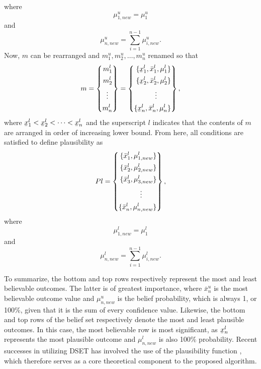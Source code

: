 \documentclass[12pt]{uthesis-v12}  %
\newcommand{\ubar}[1]{\underaccent{\bar}{#1}}
\begin{document}
\noindent where 
\begin{equation}
\mu_{1,new}^u = \mu_1^u
\label{mu1l}
\end{equation}
and
\begin{equation}
\mu_{n,new}^u = \sum_{i=1}^{n-1} \mu_{i,new}^u.
\label{mul}
\end{equation}
Now, $m$ can be rearranged and $m_{1}^{u}, m_{2}^{u},\dots, m_{n}^{u}$ renamed so that \cite{elkin}
\begin{equation}
m = \left\{
\begin{aligned}
m_1^l \\
m_2^l \\
\vdotswithin{m_n^l} \\
m_n^l
\end{aligned}
\right\}
= \left\{ 
\begin{aligned}
\{\ubar{x}_1^l, \bar{x}_1^l, \mu_1^l \} \\
\{\ubar{x}_2^l, \bar{x}_2^l, \mu_2^l \} \\
\vdotswithin{\ubar{x}_n^l, \bar{x}_n^l, \mu_n^l} \\
\{\ubar{x}_n^l, \bar{x}_n^l, \mu_n^l \}
\end{aligned}
\right\},
\label{ml}
\end{equation}
where $\ubar{x}_{1}^{l} < \ubar{x}_{2}^{l} < \dots < \ubar{x}_{n}^{l}$ and the superscript $l$ indicates that the contents of $m$ are arranged in order of increasing lower bound. From here, all conditions are satisfied to define plausibility as \cite{elkin}
\begin{equation}
Pl = \left\{
\begin{aligned}
\{\bar{x}_1^l, \mu_{1,new}^l \} \\
\{\bar{x}_2^l, \mu_{2,new}^l \} \\
\{\bar{x}_3^l, \mu_{3,new}^l \} \\
\vdotswithin{\bar{x}_n^l, \mu_{n,new}^l} \\
\{\bar{x}_n^l, \mu_{n,new}^l \}
\end{aligned}
\right\},
\label{m2}
\end{equation}
\noindent where
\begin{equation}
\mu_{1,new}^l = \mu_1^l
\label{mu1u}
\end{equation}
and
\begin{equation}
\mu_{n,new}^l = \sum_{i=1}^{n-1} \mu_{i,new}^l.
\label{muu}
\end{equation}

To summarize, the bottom and top rows respectively represent the most and least believable outcomes. The latter is of greatest importance, where $\bar{x}_n^u$ is the most believable outcome value and $\mu_{n,new}^u$ is the belief probability, which is always 1, or 100\%, given that it is the sum of every confidence value. Likewise, the bottom and top rows of the belief set respectively denote the most and least plausible outcomes. In this case, the most believable row is most significant, as $\ubar{x}_n^l$ represents the most plausible outcome and $\mu_{n,new}^l$ is also 100\% probability.
Recent successes in utilizing DSET has involved the use of the plausibility function \cite{elkin}, which therefore serves as a core theoretical component to the proposed algorithm.
\end{document}
